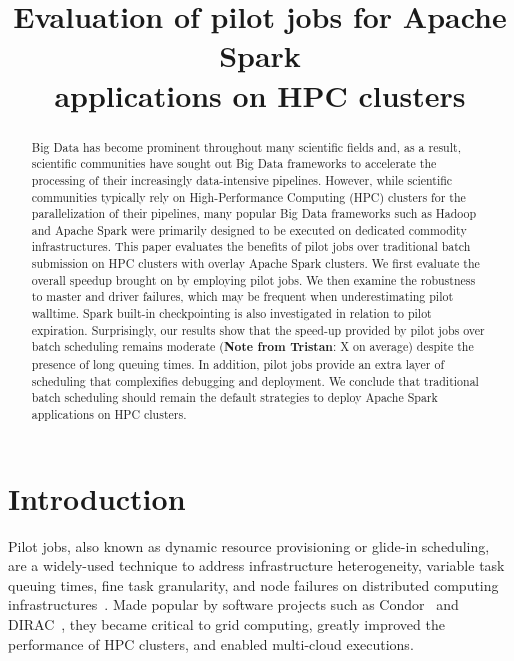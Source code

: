 \documentclass{IEEEtran}
\newcommand{\tristan}[1]{\color{red}\textbf{Note from Tristan}:
      #1 \color{black}}
\newcommand{\TG}[1]{\tristan{#1}}
\begin{document}
\title{Evaluation of pilot jobs for Apache Spark\\ applications on HPC clusters}
\author{
    \IEEEauthorblockA{}
}
\maketitle

\begin{abstract}
    Big Data has become prominent throughout many scientific fields and, as
    a result, scientific communities have sought out Big Data frameworks to
    accelerate the processing of their increasingly data-intensive
    pipelines. However, while scientific communities typically rely on
    High-Performance Computing (HPC) clusters for the parallelization of
    their pipelines, many popular Big Data frameworks such as Hadoop and
    Apache Spark were primarily designed to be executed on dedicated
    commodity infrastructures. This paper evaluates the benefits of pilot
    jobs over traditional batch submission on HPC clusters with overlay
    Apache Spark clusters. We first evaluate the overall speedup brought on
    by employing pilot jobs. We then examine the robustness to master and
    driver failures, which may be frequent when underestimating pilot
    walltime. Spark built-in checkpointing is also investigated in relation
    to pilot expiration. Surprisingly, our results show that the speed-up
    provided by pilot jobs over batch scheduling remains moderate (\TG{X} on
    average) despite the presence of long queuing times. In addition, pilot
    jobs provide an extra layer of scheduling that complexifies debugging
    and deployment. We conclude that traditional batch scheduling should
    remain the default strategies to deploy Apache Spark applications on
    HPC clusters.
\end{abstract}

\section{Introduction}

Pilot jobs, also known as dynamic resource provisioning or glide-in
scheduling, are a widely-used technique to address infrastructure
heterogeneity, variable task queuing times, fine task granularity, and node
failures on distributed computing infrastructures~\cite{jakubsmodel}. Made popular by software
projects such as Condor~\cite{thain2005distributed} and DIRAC~\cite{casajus2010dirac}, they
became critical to grid computing, greatly improved the performance of HPC
clusters, and enabled multi-cloud executions. 
\end{document}
